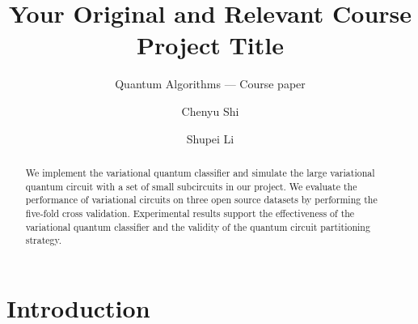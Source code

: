 \documentclass[sigconf]{acmart}
\begin{document}
\title{Your Original and Relevant Course Project Title}
\subtitle{Quantum Algorithms --- Course paper} %

\author{Chenyu Shi}

\author{Shupei Li}

\renewcommand{\shortauthors}{Shi and Li}


\begin{abstract}
We implement the variational quantum classifier and simulate the large variational quantum circuit with a set of small subcircuits in our project. We evaluate the performance of variational circuits on three open source datasets by performing the five-fold cross validation. Experimental results support the effectiveness of the variational quantum classifier and the validity of the quantum circuit partitioning strategy.

\end{abstract}

\maketitle

\section{Introduction}

\end{document}
